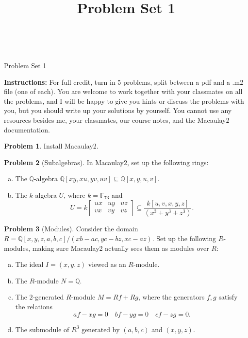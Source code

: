 \documentclass[11pt]{article}
\title{}
\date{\vspace{-0.5in}}
\title{Problem Set 1}
\theoremstyle{definition}
\newtheorem{problem}{Problem}
\begin{document}

\thispagestyle{fancy}
\pagestyle{fancy}

\


\begin{center}	
	{\LARGE Problem Set 1}
\end{center}

\vspace{3em}

\noindent
{\bf Instructions:}
For full credit, turn in 5 problems, split between a pdf and a .m2 file (one of each). 
You are welcome to work together with your classmates on all the problems, and I will be happy to give you hints or discuss the problems with you, but you should write up your solutions by yourself.
You cannot use any resources besides me, your classmates, our course notes, and the Macaulay2 documentation.

\vspace{2em}




\begin{problem} 
Install Macaulay2.%
\end{problem}


\begin{problem}[Subalgebras]
	In Macaulay2, set up the following rings:
	\begin{enumerate}[a)]
		\item The $\mathbb{Q}$-algebra $\mathbb{Q}[xy,xu,yv,uv] \subseteq \mathbb{Q}[x,y,u,v]$.
		\item The $k$-algebra $U$, where $k = \mathbb{F}_{73}$ and
		$$U = k \begin{bmatrix} ux & uy & uz \\ vx & vy & vz \end{bmatrix} \subseteq \frac{k[u,v,x,y,z]}{(x^3+y^3+z^3)}.$$
	\end{enumerate}
\end{problem}


\begin{problem}[Modules]
	Consider the domain $R = \mathbb{Q}[x,y,z,a,b,c]/(xb-ac,yc-bz,xc-az)$. Set up the following $R$-modules, making sure Macaulay2 actually sees them as modules over $R$:
	\begin{enumerate}[a)]
		\item The ideal $I = (x,y,z)$ viewed as an $R$-module.
		\item The $R$-module $N = \mathbb{Q}$.
		\item The $2$-generated $R$-module $M = Rf + Rg$, where the generators $f, g$ satisfy the relations 
		$$af-xg = 0 \quad bf - yg = 0 \quad cf - zg = 0.$$
		\item The submodule of $R^3$ generated by $(a,b,c)$ and $(x,y,z)$.
	\end{enumerate}
\end{problem}
\end{document}
